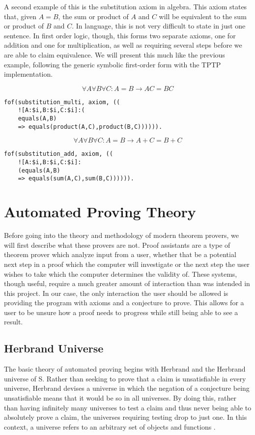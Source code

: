 A second example of this is the substitution axiom in algebra. This axiom states that, given $A = B$, the sum or product of $A$ and $C$ will be equivalent to the sum or product of $B$ and $C$. In language, this is not very difficult to state in just one sentence. In first order logic, though, this forms two separate axioms, one for addition and one for multiplication, as well as requiring several steps before we are able to claim equivalence. We will present this much like the previous example, following the generic symbolic first-order form with the TPTP implementation.

\[\forall A \forall B \forall C: A = B \rightarrow AC = BC\]

\begin{lstlisting}
fof(substitution_multi, axiom, ((       
	![A:$i,B:$i,C:$i]:(               
	equals(A,B)  
	=> equals(product(A,C),product(B,C)))))).
 \end{lstlisting} 

\[\forall A \forall B \forall C: A = B \rightarrow A+C = B+C\]
\begin{lstlisting}
fof(substitution_add, axiom, ((
	![A:$i,B:$i,C:$i]:               
	(equals(A,B)
	=> equals(sum(A,C),sum(B,C)))))).
\end{lstlisting}

\section{Automated Proving Theory}

Before going into the theory and methodology of modern theorem provers, we will first describe what these provers are not. Proof assistants are a type of theorem prover which analyze input from a user, whether that be a potential next step in a proof which the computer will investigate or the next step the user wishes to take which the computer determines the validity of. These systems, though useful, require a much greater amount of interaction than was intended in this project. In our case, the only interaction the user should be allowed is providing the program with axioms and a conjecture to prove. This allows for a user to be unsure how a proof needs to progress while still being able to see a result.

\subsection{Herbrand Universe}
The basic theory of automated proving begins with Herbrand and the Herbrand universe of S. Rather than seeking to prove that a claim is unsatisfiable in every universe, Herbrand devises a universe in which the negation of a conjecture being unsatisfiable means that it would be so in all universes. By doing this, rather than having infinitely many universes to test a claim and thus never being able to absolutely prove a claim, the universes requiring testing drop to just one. In this context, a universe refers to an arbitrary set of objects and functions \cite{gelfond1988stable}.

